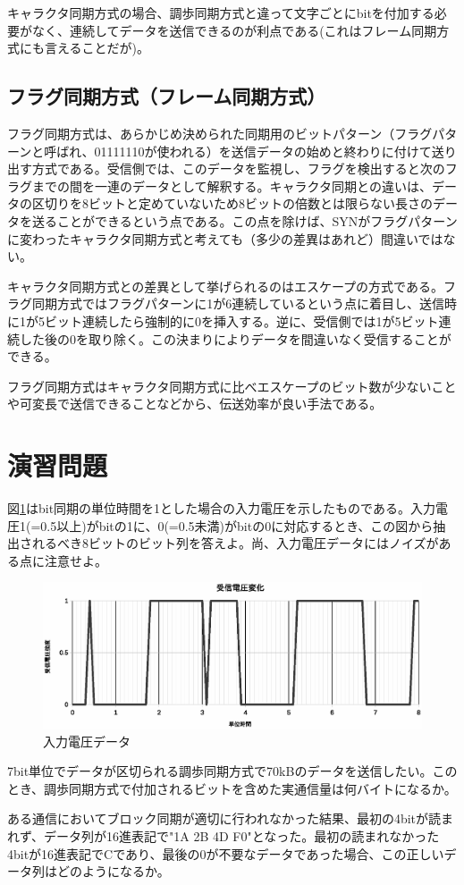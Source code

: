 キャラクタ同期方式の場合、調歩同期方式と違って文字ごとにbitを付加する必要がなく、連続してデータを送信できるのが利点である(これはフレーム同期方式にも言えることだが)。

\subsection{フラグ同期方式（フレーム同期方式）}
フラグ同期方式は、あらかじめ決められた同期用のビットパターン（フラグパターンと呼ばれ、01111110が使われる）を送信データの始めと終わりに付けて送り出す方式である。受信側では、このデータを監視し、フラグを検出すると次のフラグまでの間を一連のデータとして解釈する。キャラクタ同期との違いは、データの区切りを8ビットと定めていないため8ビットの倍数とは限らない長さのデータを送ることができるという点である。この点を除けば、SYNがフラグパターンに変わったキャラクタ同期方式と考えても（多少の差異はあれど）間違いではない。

キャラクタ同期方式との差異として挙げられるのはエスケープの方式である。フラグ同期方式ではフラグパターンに1が6連続しているという点に着目し、送信時に1が5ビット連続したら強制的に0を挿入する。逆に、受信側では1が5ビット連続した後の0を取り除く。この決まりによりデータを間違いなく受信することができる。

フラグ同期方式はキャラクタ同期方式に比べエスケープのビット数が少ないことや可変長で送信できることなどから、伝送効率が良い手法である。

\section*{演習問題}
\begin{problems}
\item 図\ref{fig4_3}はbit同期の単位時間を1とした場合の入力電圧を示したものである。入力電圧1(=0.5以上)がbitの1に、0(=0.5未満)がbitの0に対応するとき、この図から抽出されるべき8ビットのビット列を答えよ。尚、入力電圧データにはノイズがある点に注意せよ。
\begin{figure}[h]
\centering
\includegraphics[width=0.9\linewidth,keepaspectratio]{fig/fig4_3.eps}
\caption{入力電圧データ}\label{fig4_3}
\end{figure}

\item 7bit単位でデータが区切られる調歩同期方式で70kBのデータを送信したい。このとき、調歩同期方式で付加されるビットを含めた実通信量は何バイトになるか。

\item ある通信においてブロック同期が適切に行われなかった結果、最初の4bitが読まれず、データ列が16進表記で"1A 2B 4D F0"となった。最初の読まれなかった4bitが16進表記でCであり、最後の0が不要なデータであった場合、この正しいデータ列はどのようになるか。
\end{problems}

